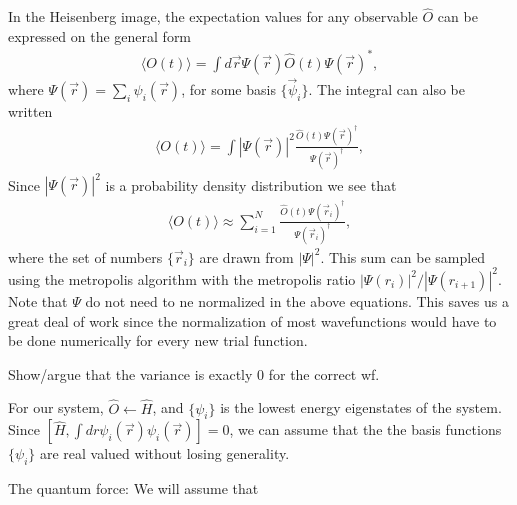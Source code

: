 \documentclass[a4paper,10pt,twocolumn]{article} %
\newcommand{\expec}[1]{\langle{}{#1}\rangle{}}
\begin{document}
In the Heisenberg image, the expectation values for any observable $\hat O$ can be expressed on the general form
\begin{align}
	\expec{ O(t) } = \int d\vec r \Psi(\vec r) \hat O(t) \Psi(\vec r)^*,
\end{align}
where $\Psi(\vec r) = \sum_i \psi_i(\vec r)$, for some basis $\{ \vec \psi_i \}$. 
The integral can also be written 
\begin{align}
	\expec{ O(t) } = \int |\Psi(\vec r)|^2 \frac{ \hat O(t) \Psi(\vec r)^\dagger } {\Psi(\vec r)^\dagger},
\end{align}
Since $|\Psi(\vec r)|^2$ is a probability density distribution we see that
\begin{align}
	\expec{ O(t) } \approx \sum_{i=1}^N \frac{ \hat O(t) \Psi(\vec r_i)^\dagger } {\Psi(\vec r_i)^\dagger}, \label{RFQMC1} 
\end{align}
%
where the set of numbers $\{\vec r_i\}$ are drawn from $|\Psi|^2$.
This sum can be sampled using the metropolis algorithm with the metropolis ratio $|\Psi(r_i)|^2/|\Psi(r_{i+1})|^2$.
%
Note that $\Psi$ do not need to ne normalized in the above equations. This saves us a great deal of work since the normalization 
of most wavefunctions would have to be done numerically for every new trial function.%

Show/argue that the variance is exactly 0 for the correct wf.

For our system, $\hat O\gets\hat H$, and $\{ \psi_i \}$ is the lowest energy eigenstates of the system. 
Since $[\hat H , \int dr \psi_i(\vec r)\psi_i(\vec r)]=0$, we can
assume that the the basis functions $\{ \psi_i \}$ are real valued without losing generality.

The quantum force:
We will assume that 






\section{}%



\tableofcontents
\end{document}
